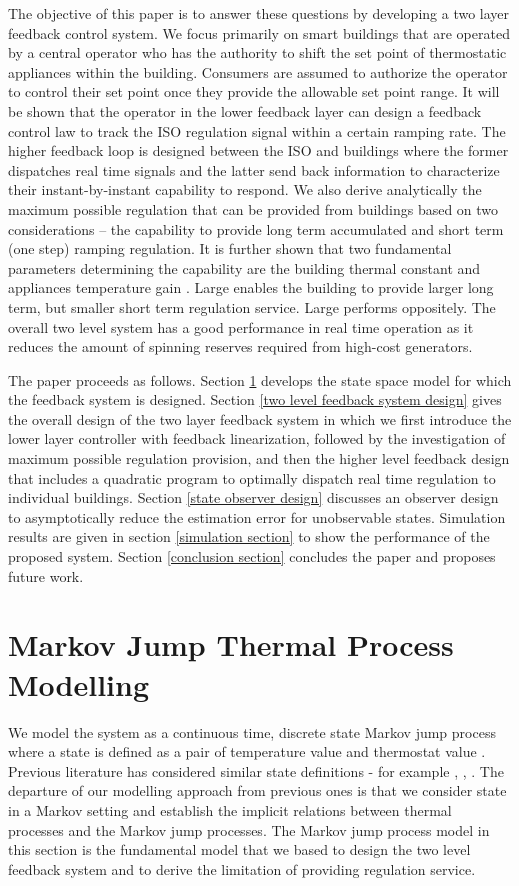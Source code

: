 \documentclass[journal]{IEEEtran}
\begin{document}
The objective of this paper is to answer these questions by developing a two layer feedback control system. We focus primarily on smart buildings that are operated by a central operator who has the authority to shift the set point of thermostatic appliances within the building. Consumers are assumed to authorize the operator to control their set point once they provide the allowable set point range. It will be shown that the operator in the lower feedback layer can design a feedback control law to track the ISO regulation signal within a certain ramping rate. The higher feedback loop is designed between the ISO and buildings where the former dispatches real time signals and the latter send back information to characterize their instant-by-instant capability to respond. We also derive analytically the maximum possible regulation that can be provided from buildings based on two considerations -- the capability to provide long term accumulated and short term (one step) ramping regulation. It is further shown that two fundamental parameters determining the capability are the building thermal constant  and appliances temperature gain . Large  enables the building to provide larger long term, but smaller short term regulation service. Large  performs oppositely. The overall two level system has a good performance in real time operation as it reduces the amount of spinning reserves required from high-cost generators.

The paper proceeds as follows. Section \ref{markov jump process model} develops the state space model for which the feedback system is designed. Section \ref{two level feedback system design} gives the overall design of the two layer feedback system in which we first introduce the lower layer controller with feedback linearization, followed by the investigation of maximum possible regulation provision, and then the higher level feedback design that includes a quadratic program to optimally dispatch real time regulation to individual buildings. Section \ref{state observer design} discusses an observer design to asymptotically reduce the estimation error for unobservable states. Simulation results are given in section \ref{simulation section} to show the performance of the proposed system. Section \ref{conclusion section} concludes the paper and proposes future work.

\section{Markov Jump Thermal Process Modelling}
\label{markov jump process model}
We model the system as a continuous time, discrete state Markov jump process where a state  is defined as a pair of temperature value and thermostat value . Previous literature has considered similar state definitions - for example \cite{chassin1}, \cite{chassin2}, \cite{duncan2}. The departure of our modelling approach from previous ones is that we consider state in a Markov setting and establish the implicit relations between thermal processes and the Markov jump processes. The Markov jump process model in this section is the fundamental model that we based to design the two level feedback system and to derive the limitation of providing regulation service.
\end{document}
